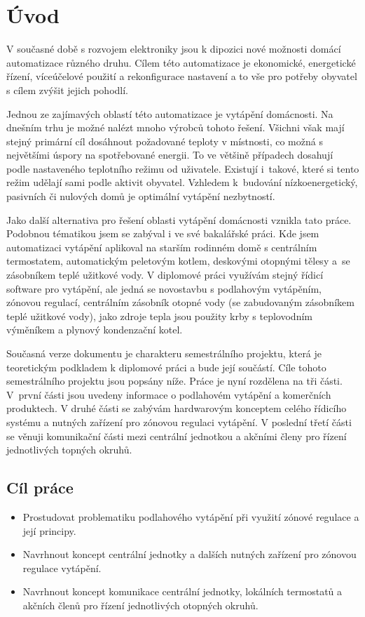 \chapter{Úvod}

V současné době s rozvojem elektroniky jsou k dipozici nové možnosti domácí automatizace různého druhu. Cílem této automatizace je ekonomické, energetické řízení, víceúčelové použití a rekonfigurace nastavení a to vše pro potřeby obyvatel s cílem zvýšit jejich pohodlí.


Jednou ze zajímavých oblastí této automatizace je vytápění domácnosti. Na dnešním trhu je možné nalézt mnoho výrobců tohoto řešení. Všichni však mají stejný primární cíl dosáhnout požadované teploty v místnosti, co možná s největšími úspory na spotřebované energii. To ve většině případech dosahují podle nastaveného teplotního režimu od uživatele. Existují i~takové, které si tento režim udělají sami podle aktivit obyvatel. Vzhledem k~budování nízkoenergetický, pasivních či nulových domů je optimální vytápění nezbytností.

Jako další alternativa pro řešení oblasti vytápění domácnosti vznikla tato práce. Podobnou tématikou jsem se zabýval i ve své bakalářské práci. Kde jsem automatizaci vytápění aplikoval na starším rodinném domě s centrálním termostatem, automatickým peletovým kotlem, deskovými otopnými tělesy a~se zásobníkem teplé užitkové vody. V diplomové práci využívám stejný řídicí software pro vytápění, ale jedná se novostavbu s podlahovým vytápěním, zónovou regulací, centrálním zásobník otopné vody (se zabudovaným zásobníkem teplé užitkové vody), jako zdroje tepla jsou použity krby s teplovodním výměníkem a plynový kondenzační kotel.

Současná verze dokumentu je charakteru semestrálního projektu, která je teoretickým podkladem k diplomové práci a bude její součástí. Cíle tohoto semestrálního projektu jsou popsány níže. Práce je nyní rozdělena na tři části. V~první části jsou uvedeny informace o podlahovém vytápění a komerčních produktech. V druhé části se zabývám hardwarovým konceptem celého řídicího systému a nutných zařízení pro zónovou regulaci vytápění. V poslední třetí části se věnuji komunikační části mezi centrální jednotkou a akčními členy pro řízení jednotlivých topných okruhů.

\section{Cíl práce}
\begin{itemize}
\item Prostudovat problematiku podlahového vytápění při využití zónové regulace a její principy.
\item Navrhnout koncept centrální jednotky a dalších nutných zařízení pro zónovou regulace vytápění.
\item Navrhnout koncept komunikace centrální jednotky, lokálních termostatů a akčních členů pro řízení jednotlivých otopných okruhů.
\end{itemize}